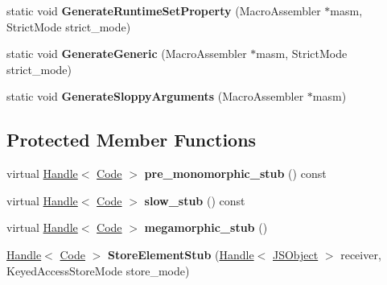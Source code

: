 \begin{DoxyCompactItemize}
\item 
\hypertarget{classv8_1_1internal_1_1_keyed_store_i_c_ab95ad11ebb2e9df6e65115261649f039}{}static void {\bfseries Generate\+Runtime\+Set\+Property} (Macro\+Assembler $\ast$masm, Strict\+Mode strict\+\_\+mode)\label{classv8_1_1internal_1_1_keyed_store_i_c_ab95ad11ebb2e9df6e65115261649f039}

\item 
\hypertarget{classv8_1_1internal_1_1_keyed_store_i_c_ac30d45d2f7c0249f87a0d3978ff35809}{}static void {\bfseries Generate\+Generic} (Macro\+Assembler $\ast$masm, Strict\+Mode strict\+\_\+mode)\label{classv8_1_1internal_1_1_keyed_store_i_c_ac30d45d2f7c0249f87a0d3978ff35809}

\item 
\hypertarget{classv8_1_1internal_1_1_keyed_store_i_c_a6748ffa120b59fdd855cfb71ffaef768}{}static void {\bfseries Generate\+Sloppy\+Arguments} (Macro\+Assembler $\ast$masm)\label{classv8_1_1internal_1_1_keyed_store_i_c_a6748ffa120b59fdd855cfb71ffaef768}

\end{DoxyCompactItemize}
\subsection*{Protected Member Functions}
\begin{DoxyCompactItemize}
\item 
\hypertarget{classv8_1_1internal_1_1_keyed_store_i_c_ad478075dfe32ffad457cb495b34bb85a}{}virtual \hyperlink{classv8_1_1internal_1_1_handle}{Handle}$<$ \hyperlink{classv8_1_1internal_1_1_code}{Code} $>$ {\bfseries pre\+\_\+monomorphic\+\_\+stub} () const \label{classv8_1_1internal_1_1_keyed_store_i_c_ad478075dfe32ffad457cb495b34bb85a}

\item 
\hypertarget{classv8_1_1internal_1_1_keyed_store_i_c_ae8579ccd5bc1cfbb429af0aba9d90224}{}virtual \hyperlink{classv8_1_1internal_1_1_handle}{Handle}$<$ \hyperlink{classv8_1_1internal_1_1_code}{Code} $>$ {\bfseries slow\+\_\+stub} () const \label{classv8_1_1internal_1_1_keyed_store_i_c_ae8579ccd5bc1cfbb429af0aba9d90224}

\item 
\hypertarget{classv8_1_1internal_1_1_keyed_store_i_c_a9a1f8416ab8db53c00f071658eb20b22}{}virtual \hyperlink{classv8_1_1internal_1_1_handle}{Handle}$<$ \hyperlink{classv8_1_1internal_1_1_code}{Code} $>$ {\bfseries megamorphic\+\_\+stub} ()\label{classv8_1_1internal_1_1_keyed_store_i_c_a9a1f8416ab8db53c00f071658eb20b22}

\item 
\hypertarget{classv8_1_1internal_1_1_keyed_store_i_c_ab25b2fb9fa8725bd6f68385f5a1113c2}{}\hyperlink{classv8_1_1internal_1_1_handle}{Handle}$<$ \hyperlink{classv8_1_1internal_1_1_code}{Code} $>$ {\bfseries Store\+Element\+Stub} (\hyperlink{classv8_1_1internal_1_1_handle}{Handle}$<$ \hyperlink{classv8_1_1internal_1_1_j_s_object}{J\+S\+Object} $>$ receiver, Keyed\+Access\+Store\+Mode store\+\_\+mode)\label{classv8_1_1internal_1_1_keyed_store_i_c_ab25b2fb9fa8725bd6f68385f5a1113c2}

\end{DoxyCompactItemize}
